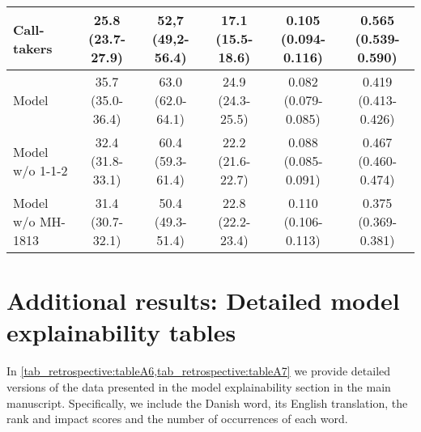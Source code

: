 {\begin{table}
{\begin{tabular}{l|ccccc}
        Call-takers  & \makecell[c]{25.8 \\ (23.7-27.9)} & \makecell[c]{52,7 \\ (49,2-56.4)} & \makecell[c]{17.1 \\ (15.5-18.6)} & \makecell[c]{0.105 \\ (0.094-0.116)} & \makecell[c]{0.565 \\ (0.539-0.590)} \\
        \midrule
        Model        & \makecell[c]{35.7 \\ (35.0-36.4)} & \makecell[c]{63.0 \\ (62.0-64.1)} & \makecell[c]{24.9 \\ (24.3-25.5)} & \makecell[c]{0.082 \\ (0.079-0.085)} & \makecell[c]{0.419 \\ (0.413-0.426)} \\
        \midrule
        \makecell[l]{Model \\ w/o 1-1-2} & \makecell[c]{32.4 \\ (31.8-33.1)} & \makecell[c]{60.4 \\ (59.3-61.4)} & \makecell[c]{22.2 \\ (21.6-22.7)} & \makecell[c]{0.088 \\ (0.085-0.091)} & \makecell[c]{0.467 \\ (0.460-0.474)} \\
        \midrule
        \makecell[l]{Model \\ w/o MH-1813} & \makecell[c]{31.4 \\ (30.7-32.1)} & \makecell[c]{50.4 \\ (49.3-51.4)} & \makecell[c]{22.8 \\ (22.2-23.4)} & \makecell[c]{0.110 \\ (0.106-0.113)} & \makecell[c]{0.375 \\ (0.369-0.381)} \\

        \bottomrule
    \end{tabular}%
    }
\end{table}


\section{Additional results: Detailed model explainability tables}

In \cref{tab_retrospective:tableA6,tab_retrospective:tableA7} we provide detailed versions of the data presented in the model explainability section in the main manuscript. Specifically, we include the Danish word, its English translation, the rank and impact scores and the number of occurrences of each word.

}
